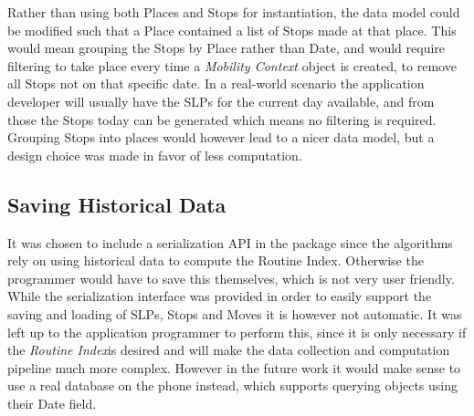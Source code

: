 Rather than using both Places and Stops for instantiation, the data model could be modified such that a Place contained a list of Stops made at that place. This would mean grouping the Stops by Place rather than Date, and would require filtering to take place every time a \textit{Mobility Context} object is created, to remove all Stops not on that specific date. In a real-world scenario the application developer will usually have the SLPs for the current day available, and from those the Stops today can be generated which means no filtering is required. Grouping Stops into places would however lead to a nicer data model, but a design choice was made in favor of less computation. 

\subsection{Saving Historical Data}
It was chosen to include a serialization API in the package since the algorithms rely on using historical data to compute the Routine Index. Otherwise the programmer would have to save this themselves, which is not very user friendly. While the serialization interface was provided in order to easily support the saving and loading of SLPs, Stops and Moves it is however not automatic. It was left up to the application programmer to perform this, since it is only necessary if the \textit{Routine Index}is desired and will make the data collection and computation pipeline much more complex. However in the future work it would make sense to use a real database on the phone instead, which supports querying objects using their Date field. 